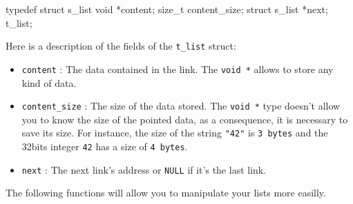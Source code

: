 \documentclass{42-en}
\begin{document}
    \begin{42ccode}
typedef struct      s_list
{
    void            *content;
    size_t          content_size;
    struct s_list   *next;
}                   t_list;
    \end{42ccode}

    Here is a description of the fields of the \texttt{t\_list}
    struct:\\

    \begin{itemize}

        \item \texttt{content} : The data contained in the link. The
          \texttt{void *} allows to store any kind of data.

        \item \texttt{content\_size} : The size of the data stored.
          The \texttt{void *} type doesn't allow you to know the size
          of the pointed data, as a consequence, it is necessary to
          save its size. For instance, the size of the string
          \texttt{"42"} is \texttt{3 bytes} and the 32bits integer
          \texttt{42} has a size of \texttt{4 bytes}.

        \item \texttt{next} : The next link's address or \texttt{NULL}
          if it's the last link.

    \end{itemize}

    \newpage
    The following functions will allow you to manipulate your lists
    more easilly.\\
\end{document}

